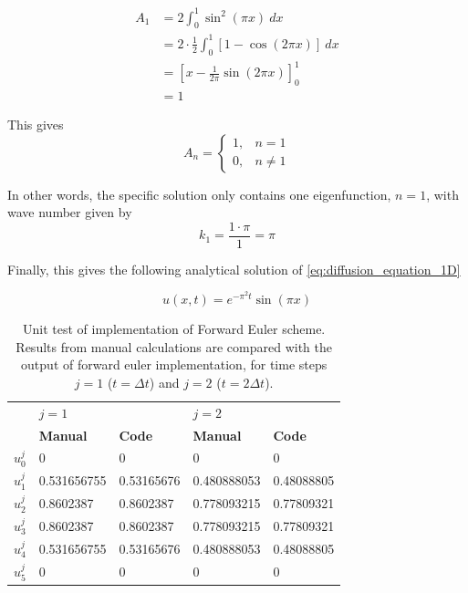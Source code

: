 \documentclass[12pt]{extarticle}
\begin{document}
\begin{align*}
	A_1 &= 2 \int_0^1 \sin^2(\pi x)\:dx \\
	&= 2\cdot \frac{1}{2} \int_0^1 [1 - \cos(2\pi x)]\:dx \\
	&= [x - \frac{1}{2\pi}\sin(2\pi x)]_0^1 \\
	&= 1
\end{align*}

This gives
\[ A_n = \begin{cases}
	1, & n=1 \\
	0, & n\ne 1
\end{cases} \]

In other words, the specific solution only contains one eigenfunction, $n=1$, with wave number given by
\[ k_1 = \frac{1\cdot \pi}{1} = \pi \]

Finally, this gives the following analytical solution of \eqref{eq:diffusion_equation_1D}

\[ u(x,t) = e^{-\pi^2 t} \sin(\pi x) \]


\begin{table}[h]
	\centering
	\begin{tabular}{l|ll|ll|}
		\cline{2-5}
		& \multicolumn{2}{l|}{\textbf{$j=1$}}                 & \multicolumn{2}{l|}{\textbf{$j=2$}}                  \\ \cline{2-5} 
		& \multicolumn{1}{l|}{\textbf{Manual}} & \textbf{Code} & \multicolumn{1}{l|}{\textbf{Manual}} & \textbf{Code} \\ \hline
		\multicolumn{1}{|l|}{$u_0^j$} & \multicolumn{1}{l|}{0}               & 0             & \multicolumn{1}{l|}{0}               & 0             \\ \hline
		\multicolumn{1}{|l|}{$u_1^j$} & \multicolumn{1}{l|}{0.531656755}     & 0.53165676    & \multicolumn{1}{l|}{0.480888053}     & 0.48088805    \\ \hline
		\multicolumn{1}{|l|}{$u_2^j$} & \multicolumn{1}{l|}{0.8602387}       & 0.8602387     & \multicolumn{1}{l|}{0.778093215}     & 0.77809321    \\ \hline
		\multicolumn{1}{|l|}{$u_3^j$} & \multicolumn{1}{l|}{0.8602387}       & 0.8602387     & \multicolumn{1}{l|}{0.778093215}     & 0.77809321    \\ \hline
		\multicolumn{1}{|l|}{$u_4^j$} & \multicolumn{1}{l|}{0.531656755}     & 0.53165676    & \multicolumn{1}{l|}{0.480888053}     & 0.48088805    \\ \hline
		\multicolumn{1}{|l|}{$u_5^j$} & \multicolumn{1}{l|}{0}               & 0             & \multicolumn{1}{l|}{0}               & 0             \\ \hline
	\end{tabular}
	\caption{Unit test of implementation of Forward Euler scheme. Results from manual calculations are compared with the output of forward euler implementation, for time steps $j=1$ ($t = \Delta t$) and $j=2$ ($t = 2\Delta t$).}
	\label{tab:unit_test}
\end{table}




\end{document}
